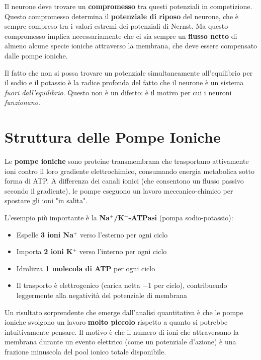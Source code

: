Il neurone deve trovare un \textbf{compromesso} tra questi potenziali in competizione. Questo compromesso determina il \textbf{potenziale di riposo} del neurone, che è sempre compreso tra i valori estremi dei potenziali di Nernst. Ma questo compromesso implica necessariamente che ci sia sempre un \textbf{flusso netto} di almeno alcune specie ioniche attraverso la membrana, che deve essere compensato dalle pompe ioniche.

\begin{tcolorbox}[colback=gray!5, colframe=gray!40, arc=2mm, boxrule=0.5pt]
 Il fatto che non si possa trovare un potenziale simultaneamente all'equilibrio per il sodio e il potassio è la radice profonda del fatto che il neurone è un sistema \textit{fuori dall'equilibrio}. Questo non è un difetto: è il motivo per cui i neuroni \textit{funzionano}.
\end{tcolorbox}

\section{Struttura delle Pompe Ioniche}

Le \textbf{pompe ioniche} sono proteine transmembrana che trasportano attivamente ioni contro il loro gradiente elettrochimico, consumando energia metabolica sotto forma di ATP. A differenza dei canali ionici (che consentono un flusso passivo secondo il gradiente), le pompe eseguono un lavoro meccanico-chimico per spostare gli ioni "in salita".

L'esempio più importante è la \textbf{Na$^+$/K$^+$-ATPasi} (pompa sodio-potassio):

\begin{itemize}
    \item Espelle \textbf{3 ioni Na$^+$} verso l'esterno per ogni ciclo
    \item Importa \textbf{2 ioni K$^+$} verso l'interno per ogni ciclo
    \item Idrolizza \textbf{1 molecola di ATP} per ogni ciclo
    \item Il trasporto è elettrogenico (carica netta $-1$ per ciclo), contribuendo leggermente alla negatività del potenziale di membrana
\end{itemize}


Un risultato sorprendente che emerge dall'analisi quantitativa è che le pompe ioniche svolgono un lavoro \textbf{molto piccolo} rispetto a quanto si potrebbe intuitivamente pensare. Il motivo è che il numero di ioni che attraversano la membrana durante un evento elettrico (come un potenziale d'azione) è una frazione minuscola del pool ionico totale disponibile.

